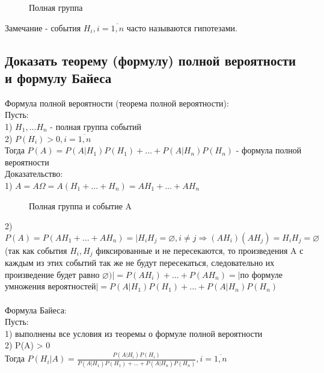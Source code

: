 \begin{figure}[H]
	\caption{Полная группа}
\end{figure}

Замечание - события $H_{i}, i = \overline{1, n}$ часто называются гипотезами.\\

\subsection{Доказать теорему (формулу) полной вероятности и формулу Байеса}
Формула полной вероятности (теорема полной вероятности):\\
Пусть:\\
1) $H_{1}, ... H_{n}$ - полная группа событий\\
2) $P(H_{i}) > 0, i = \overline{1, n}$\\

Тогда $P(A) = P(A|H_{1})P(H_{1}) + ... + P(A|H_{n})P(H_{n})$ - формула полной вероятности\\

Доказательство:\\
1) $A = A \Omega = A (H_{1} + ... + H_{n}) = A H_{1} + ... + A H_{n}$\\
\begin{figure}[H]
	\caption{Полная группа и событие A}
\end{figure}
2) $P(A) = P(A H_{1} + ... + A H_{n}) = | H_{i} H_{j} = \varnothing, i \neq j \Rightarrow (A H_{i}) (A H_{j}) = H_{i} H_{j} = \varnothing $ (так как события $H_{i}, H_{j}$ фиксированные и не пересекаются, то произведения A с каждым из этих событий так же не будут пересекаться, следовательно их произведение будет равно $\varnothing) | = P(A H_{i}) + ... + P(A H_{n}) = |$по формуле умножения вероятностей$| = P(A|H_{1})P(H_{1}) + ... + P(A|H_{n})P(H_{n})$\\
\\

Формула Байеса:\\
Пусть:\\
1) выполнены все условия из теоремы о формуле полной вероятности\\
2) P(A) > 0\\

Тогда $P(H_{i}|A) = \frac{P(A|H_{i})P(H_{i})}{P(A|H_{1})P(H_{1}) + ... + P(A|H_{n})P(H_{n})}, i = \overline{1, n}$\\

